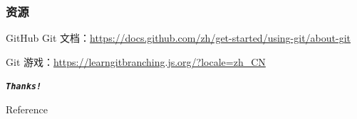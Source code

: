 \documentclass[UTF8, 16pt]{beamer}
\begin{document}
\begin{frame}
    \frametitle{资源}
    \textcolor{sufered}{GitHub Git 文档：}\url{https://docs.github.com/zh/get-started/using-git/about-git}

    \textcolor{sufered}{Git 游戏：}\url{https://learngitbranching.js.org/?locale=zh_CN}
\end{frame}

\begin{frame}[allowframebreaks]%
    \begin{center}
        \Huge\textbf{\textit{\texttt{Thanks!}}}
    \end{center}
\end{frame}

\appendix
\begin{frame}{Reference}
    \nocite{mit}
    \nocite{linuxcool}
    \addtocounter{framenumber}{-1}
    \printbibliography{} %
\end{frame}
\end{document}
